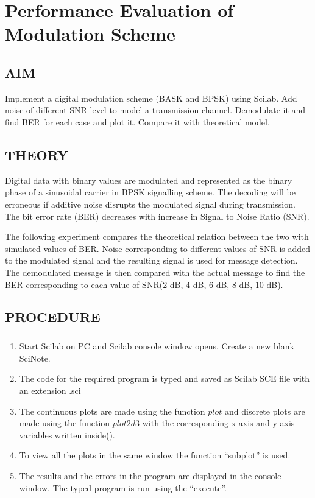 \chapter [Performance Comparison of Modulation Scheme]{Performance Evaluation of Modulation Scheme}


\section{AIM}

Implement a digital modulation scheme (BASK and BPSK) using Scilab. Add noise of different SNR level to model a transmission channel. Demodulate it and find BER for each case and plot it. Compare it with theoretical model.


\section{THEORY}

Digital data with binary values are modulated and represented as the binary phase of a sinusoidal carrier in BPSK signalling scheme. The decoding will be erroneous if additive noise disrupts the modulated signal during transmission. The bit error rate (BER) decreases with increase in Signal to Noise Ratio (SNR). 

The following experiment compares the theoretical relation between the two with simulated values of BER. Noise corresponding to different values of SNR is added to the modulated signal and the resulting signal is used for message detection. The demodulated message is then compared with the actual message to find the BER corresponding to each value of SNR(2 dB, 4 dB, 6 dB, 8 dB, 10 dB).

\section{PROCEDURE}

\paragraph{}
\begin{enumerate}
\item
Start Scilab on PC and Scilab console window opens. Create a new blank SciNote.
\item
The code for the required program is typed and saved as Scilab SCE file with an extension .sci
\item

The continuous plots are made using the function $plot$ and discrete plots are made using the function $plot2d3$ with the corresponding x axis and y axis variables written inside().

\item
To view all the plots in the same window the function “subplot” is used.
\item
The results and the errors in the program are displayed in the console window.
The typed program is run using the “execute”.
\end{enumerate}

